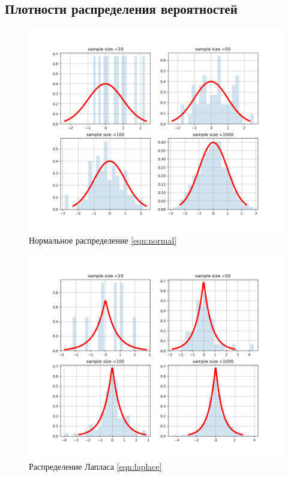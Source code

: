 \documentclass[a4]{article}
\begin{document}
\subsection{Плотности распределения вероятностей}

\begin{figure}[H]
    \centering
    \includegraphics[width=\textwidth]{Lab1_normal.png} 
    \caption{Нормальное распределение \eqref{eqn:normal}}
    \label{fig:dis_norm_gis}
\end{figure}

\begin{figure}[H]
    \centering
    \includegraphics[width=\textwidth]{Lab1_laplace.png}
    \caption{Распределение Лапласа \eqref{eqn:laplace}}
    \label{fig:dis_lapl_gis}
\end{figure}
\end{document}
